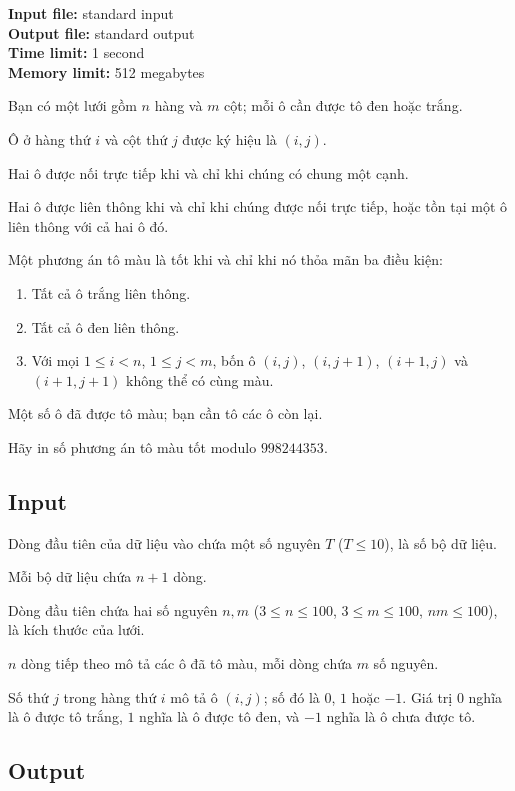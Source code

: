 \documentclass[11pt]{article}
\begin{document}
\noindent
\textbf{Input file:} standard input\\
\textbf{Output file:} standard output\\
\textbf{Time limit:} 1 second\\
\textbf{Memory limit:} 512 megabytes

Bạn có một lưới gồm $n$ hàng và $m$ cột; mỗi ô cần được tô đen hoặc trắng.

Ô ở hàng thứ $i$ và cột thứ $j$ được ký hiệu là $(i,j)$.

Hai ô được nối trực tiếp khi và chỉ khi chúng có chung một cạnh.

Hai ô được liên thông khi và chỉ khi chúng được nối trực tiếp, hoặc tồn tại
một ô liên thông với cả hai ô đó.

Một phương án tô màu là tốt khi và chỉ khi nó thỏa mãn ba điều kiện:
\begin{enumerate}
  \item Tất cả ô trắng liên thông.
  \item Tất cả ô đen liên thông.
  \item Với mọi $1\le i<n$, $1\le j<m$, bốn ô
  $(i,j)$, $(i,j+1)$, $(i+1,j)$ và $(i+1,j+1)$ không thể có cùng màu.
\end{enumerate}

Một số ô đã được tô màu; bạn cần tô các ô còn lại.

Hãy in số phương án tô màu tốt modulo $998244353$.

\subsection*{Input}

Dòng đầu tiên của dữ liệu vào chứa một số nguyên $T$ ($T\le 10$), là số bộ dữ
liệu.

Mỗi bộ dữ liệu chứa $n+1$ dòng.

Dòng đầu tiên chứa hai số nguyên $n,m$
($3\le n\le 100$, $3\le m\le 100$, $nm\le 100$), là kích thước của lưới.

$n$ dòng tiếp theo mô tả các ô đã tô màu, mỗi dòng chứa $m$ số nguyên.

Số thứ $j$ trong hàng thứ $i$ mô tả ô $(i,j)$; số đó là $0$, $1$ hoặc $-1$.
Giá trị $0$ nghĩa là ô được tô trắng, $1$ nghĩa là ô được tô đen, và $-1$
nghĩa là ô chưa được tô.

\subsection*{Output}
\end{document}

